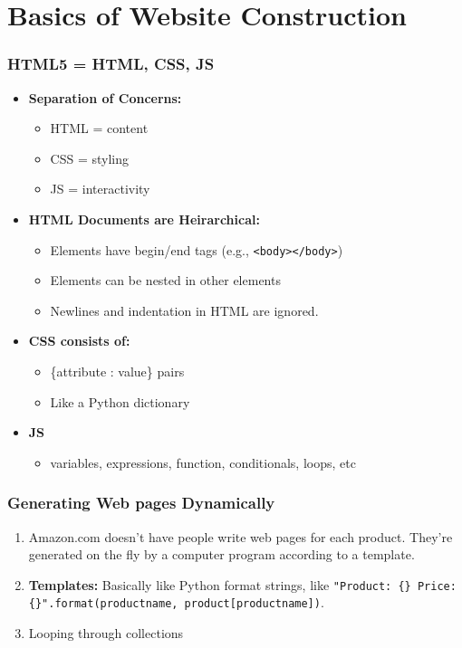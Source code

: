 \documentclass{beamer}
\begin{document}
\section{Basics of Website Construction}
%
%
\begin{frame}[fragile]
    \frametitle{HTML5 = HTML, CSS, JS}
    \pause
    \begin{itemize}
        \item \textbf{Separation of Concerns: }
            \begin{itemize}
                \item HTML = content
                \item CSS = styling
                \item JS = interactivity
            \end{itemize}
            \pause
        \item \textbf{HTML Documents are Heirarchical: }
            \begin{itemize}
                \item Elements have begin/end tags (e.g., \lstinline|<body></body>|)
                \item Elements can be nested in other elements
                \item Newlines and indentation in HTML are ignored.
            \end{itemize}
            \pause
        \item \textbf{CSS consists of:}
            \begin{itemize}
                \item \{attribute : value\} pairs
                \item Like a Python dictionary
            \end{itemize}
            \pause
        \item \textbf{JS}
            \begin{itemize}
                \item variables, expressions, function, conditionals, loops, etc
            \end{itemize}
    \end{itemize}
\end{frame}
%
%
\begin{frame}[fragile]
    \frametitle{Generating Web pages Dynamically}
    \begin{enumerate}[A]
        \item Amazon.com doesn't have people write web pages for each product. They're generated on the fly by a computer program according to a template.
        \item \textbf{Templates: } Basically like Python format strings, like \lstinline|"Product: {} Price: {}".format(productname, product[productname])|.
        \item Looping through collections
    \end{enumerate}
\end{frame}
\end{document}
